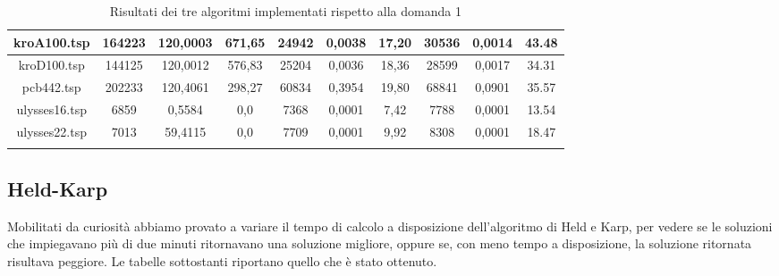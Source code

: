 \begin{center}
\begin{longtable}{|c|c|c|c|c|c|c|c|c|c|}
		kroA100.tsp& 164223 & 120,0003 & 671,65 & 24942 & 0,0038 & 17,20&30536 &0,0014 &43.48 \\ \hline
		kroD100.tsp& 144125 &120,0012 &576,83 &25204 & 0,0036 & 18,36 &28599 &0,0017 &34.31 \\ \hline
		pcb442.tsp& 202233&120,4061 &298,27 & 60834 & 0,3954 & 19,80 &68841 &0,0901 & 35.57\\ \hline
		ulysses16.tsp&6859 &0,5584 & 0,0 & 7368 & 0,0001 & 7,42&7788 & 0,0001 & 13.54\\ \hline
		ulysses22.tsp&7013 &59,4115 &0,0 &  7709 & 0,0001 & 9,92 &8308 &0,0001 &18.47 \\ \hline		 
     \caption{Risultati dei tre algoritmi implementati rispetto alla domanda 1}
     \label{results}
	\end{longtable}
\end{center}


\subsection{Held-Karp}
Mobilitati da curiosità abbiamo provato a variare il tempo di calcolo a disposizione dell'algoritmo di Held e Karp, per vedere se le soluzioni che impiegavano più di due minuti ritornavano una soluzione migliore, oppure se, con meno tempo a disposizione, la soluzione ritornata risultava peggiore. Le tabelle sottostanti riportano quello che è stato ottenuto.

